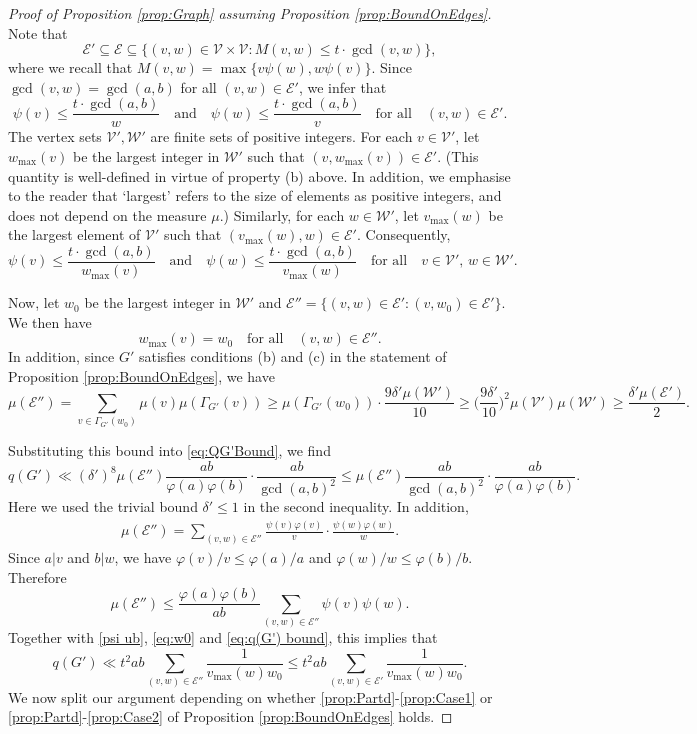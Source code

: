 \documentclass[12pt]{amsart}
\numberwithin{equation}{section}
\theoremstyle{definition}
\theoremstyle{remark}
\newcommand{\CE}{\mathcal{E}}
\newcommand{\CV}{\mathcal{V}}
\newcommand{\CW}{\mathcal{W}}
\newcommand{\als}[1]{\begin{align*} #1 \end{align*} }
\renewcommand{\phi}{\varphi}
\renewcommand{\le}{\leqslant}
\renewcommand{\ge}{\geqslant}
\begin{document}
\begin{proof}[Proof of Proposition \ref{prop:Graph} assuming Proposition \ref{prop:BoundOnEdges}]
\medskip

Note that 
\[
\CE'\subseteq\CE
\subseteq\{(v,w)\in\CV\times\CV: M(v,w)\le t\cdot \gcd(v,w)\},
\]
where we recall that $M(v,w)=\max\{v\psi(w),w\psi(v)\}$. 
Since $\gcd(v,w)=\gcd(a,b)$ for all $(v,w)\in\CE'$, we infer that
\[
\psi(v)\le \frac{t\cdot \gcd(a,b)}{w}
\quad\text{and}\quad 
\psi(w)\le \frac{t\cdot \gcd(a,b)}{v}
\quad\text{for all}\quad 
(v,w)\in\CE'.
\]
The vertex sets $\CV',\CW'$ are finite sets of positive integers. For each $v\in\CV'$, let $w_{\max}(v)$ be the largest integer in $\CW'$ such that $(v,w_{\max}(v))\in\CE'$. (This quantity is well-defined in virtue of property (b) above. In addition, we emphasise to the reader that `largest' refers to the size of elements as positive integers, and does not depend on the measure $\mu$.) Similarly, for each $w\in\CW'$, let $v_{\max}(w)$ be the largest element of $\CV'$ such that $(v_{\max}(w),w)\in\CE'$. Consequently,
\begin{equation}\label{psi ub}
\psi(v)\le \frac{t\cdot \gcd(a,b)}{w_{\max}(v)}
\quad\text{and}\quad 
\psi(w)\le \frac{t\cdot \gcd(a,b)}{v_{\max}(w)}
\quad\text{for all}\quad v\in \CV',\,w\in\CW'.
\end{equation}


Now, let $w_0$ be the largest integer in $\CW'$ and $\CE''=\{(v,w)\in\CE': (v,w_0)\in\CE'\}$. We then have
\begin{equation}\label{eq:w0}
w_{\max}(v)=w_0 \quad\text{for all}\quad(v,w)\in\CE'' .
\end{equation}
In addition, since $G'$ satisfies conditions (b) and (c) in the statement of Proposition \ref{prop:BoundOnEdges}, we have
\[
\mu(\CE'') 
	=\sum_{v\in \Gamma_{G'}(w_0)}\mu(v)\mu(\Gamma_{G'}(v))
	\ge \mu(\Gamma_{G'}(w_0))\cdot \frac{9\delta'\mu(\CW')}{10}
	\ge \bigg(\frac{9\delta'}{10}\bigg)^2 \mu(\CV')\mu(\CW')\ge \frac{\delta'\mu(\CE')}{2} .
\]


Substituting this bound into \eqref{eq:QG'Bound}, we find
\begin{equation}\label{eq:q(G') bound}
q(G') \ll (\delta')^{8} \mu(\CE'')  \frac{a b}{\phi(a)\phi(b)}\cdot \frac{a b}{\gcd(a,b)^2} 
	\le \mu(\CE'')  \frac{ab}{\gcd(a,b)^2} \cdot \frac{ab}{\phi(a)\phi(b)} .
\end{equation}
Here we used the trivial bound $\delta'\le 1$ in the second inequality.
In addition,
\als{
\mu(\CE'')  = \sum_{(v,w)\in\CE''} \frac{\psi(v)\phi(v)}{v} \cdot \frac{\psi(w)\phi(w)}{w} .
}
Since $a|v$ and $b|w$, we have $\phi(v)/v\le \phi(a)/a$ and $\phi(w)/w\le \phi(b)/b$. Therefore 
\[
\mu(\CE'')\le \frac{\phi(a)\phi(b)}{a b}\sum_{(v,w)\in\CE''}\psi(v)\psi(w).
\]
Together with \eqref{psi ub}, \eqref{eq:w0} and \eqref{eq:q(G') bound}, this implies that
\begin{equation}
q(G') \ll  t^2ab \sum_{(v,w)\in\CE''} \frac{1}{v_{\max}(w) w_0}  
	\le  t^2ab \sum_{(v,w)\in\CE'} \frac{1}{v_{\max}(w) w_0}  .
\label{eq:G'Quality}
\end{equation}
We now split our argument depending on whether \ref{prop:Partd}-\ref{prop:Case1} or \ref{prop:Partd}-\ref{prop:Case2} of Proposition \ref{prop:BoundOnEdges} holds.


\end{proof}
\end{document}

